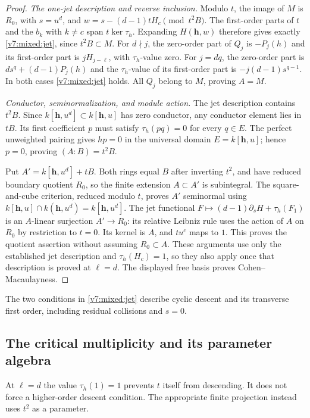 \documentclass[10pt,fleqn]{article}
\numberwithin{equation}{section}
\begin{document}
\begin{proof}
\textit{The one-jet description and reverse inclusion.}
Modulo $t$, the image of $M$ is $R_0$, with $s=u^d$, and
$w=s-(d-1)tH_c\pmod{t^2B}$.  The first-order parts of $t$ and the
$b_k$ with $k\ne c$ span $t\ker\tau_h$.  Expanding $H(\mathbf h,w)$
therefore gives exactly \eqref{v7:mixed:jet}, since $t^2B\subset M$.
For $d\nmid j$, the zero-order part of $Q_j$ is $-P_j(h)$ and its
first-order part is $jH_{j-\ell}$, with $\tau_h$-value zero.  For $j=dq$,
the zero-order part is $ds^q+(d-1)P_j(h)$ and the $\tau_h$-value of its
first-order part is $-j(d-1)s^{q-1}$.  In both cases \eqref{v7:mixed:jet} holds.
All $Q_j$ belong to $M$, proving $A=M$.

\textit{Conductor, seminormalization, and module action.}
The jet description contains $t^2B$.  Since
$k[\mathbf h,u^d]\subset k[\mathbf h,u]$ has zero conductor,
any conductor element lies in $tB$.  Its first coefficient $p$ must
satisfy $\tau_h(pq)=0$ for every $q\in E$.  The perfect unweighted
pairing gives $hp=0$ in the universal domain $E=k[\mathbf h,u]$;
hence $p=0$, proving $(A:B)=t^2B$.

Put $A'=k[\mathbf h,u^d]+tB$.  Both rings equal $B$ after inverting
$t^2$, and have reduced boundary quotient $R_0$, so the finite
extension $A\subset A'$ is subintegral.  The square-and-cube criterion,
reduced modulo $t$, proves $A'$ seminormal using
$k[\mathbf h,u]\cap k(\mathbf h,u^d)=k[\mathbf h,u^d]$.
The jet functional
$F\mapsto(d-1)\partial_sH+\tau_h(F_1)$ is an $A$-linear surjection
$A'\to R_0$: its relative Leibniz rule uses the action of $A$ on
$R_0$ by restriction to $t=0$.  Its kernel is $A$, and $tu^c$ maps
to $1$.  This proves the quotient assertion without assuming $R_0\subset A$.
These arguments use only the established jet description and
$\tau_h(H_c)=1$, so they also apply once that description is proved
at $\ell=d$.  The displayed free basis proves Cohen--Macaulayness.
\end{proof}

The two conditions in \eqref{v7:mixed:jet} describe cyclic descent and
its transverse first order, including residual collisions and $s=0$.

\subsection{The critical multiplicity and its parameter algebra}
\label{v8:mixed:critical-section}

At $\ell=d$ the value $\tau_h(1)=1$ prevents $t$ itself from descending.
It does not force a higher-order descent condition.  The appropriate
finite projection instead uses $t^2$ as a parameter.
\end{document}
